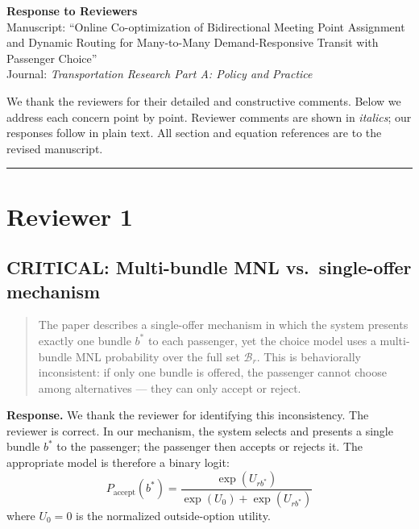 \documentclass[12pt]{article}
\newenvironment{revcomment}{%
  \begin{quote}\itshape
}{%
  \end{quote}
}
\begin{document}
\begin{center}
  {\Large\bfseries Response to Reviewers}\\[1ex]
  {\normalsize Manuscript: ``Online Co-optimization of Bidirectional Meeting Point Assignment\\
  and Dynamic Routing for Many-to-Many Demand-Responsive Transit with Passenger Choice''}\\[0.5ex]
  {\normalsize Journal: \textit{Transportation Research Part A: Policy and Practice}}
\end{center}

\bigskip

We thank the reviewers for their detailed and constructive comments. Below we address each concern point by point. Reviewer comments are shown in \textit{italics}; our responses follow in plain text. All section and equation references are to the revised manuscript.

\bigskip\hrule\bigskip

\section*{Reviewer 1}

\subsection*{CRITICAL: Multi-bundle MNL vs.\ single-offer mechanism}

\begin{revcomment}
The paper describes a single-offer mechanism in which the system presents exactly one bundle $b^*$ to each passenger, yet the choice model uses a multi-bundle MNL probability over the full set $\mathcal{B}_r$. This is behaviorally inconsistent: if only one bundle is offered, the passenger cannot choose among alternatives --- they can only accept or reject.
\end{revcomment}

\textbf{Response.} We thank the reviewer for identifying this inconsistency. The reviewer is correct. In our mechanism, the system selects and presents a single bundle $b^*$ to the passenger; the passenger then accepts or rejects it. The appropriate model is therefore a binary logit:
\[
  P_{\text{accept}}(b^*) = \frac{\exp(U_{rb^*})}{\exp(U_0) + \exp(U_{rb^*})}
\]
where $U_0 = 0$ is the normalized outside-option utility.
\end{document}

